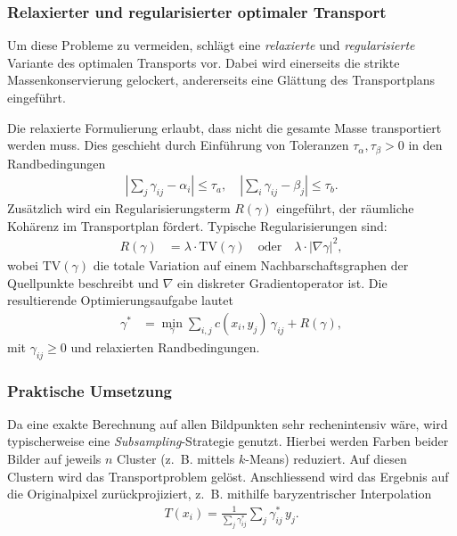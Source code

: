 \subsubsection{Relaxierter und regularisierter optimaler Transport}
Um diese Probleme zu vermeiden,
schlägt \cite{mongekant:color} eine \emph{relaxierte} und \emph{regularisierte}
%
%
Variante des optimalen Transports vor.
Dabei wird einerseits die strikte Massenkonservierung gelockert,
andererseits eine Glättung des Transportplans eingeführt.

Die relaxierte Formulierung erlaubt,
dass nicht die gesamte Masse transportiert werden muss.
Dies geschieht durch Einführung von Toleranzen $\tau_\alpha, \tau_\beta > 0$
in den Randbedingungen
\begin{align*}
\left| \sum_{j} \gamma_{ij} - \alpha_i \right|
\leq
\tau_a
, \quad
\left| \sum_{i} \gamma_{ij} - \beta_j \right|
\leq
\tau_b.
\end{align*}
Zusätzlich wird ein Regularisierungsterm $R(\gamma)$ eingeführt,
der räumliche Kohärenz im Transportplan fördert.
Typische Regularisierungen sind:
\begin{align*}
R(\gamma)
&=
\lambda \cdot \mathrm{TV}(\gamma)
\quad \text{oder} \quad
\lambda \cdot |\nabla \gamma|^2,
\end{align*}
wobei $\mathrm{TV}(\gamma)$ die totale Variation \cite{mongekant:totvar}
auf einem Nachbarschaftsgraphen der Quellpunkte beschreibt
und $\nabla$ ein diskreter Gradientoperator ist.
Die resultierende Optimierungsaufgabe lautet
\begin{align*}
\gamma^\ast
&=
\min_{\gamma} \sum_{i,j} c(x_i, y_j)\, \gamma_{ij} + R(\gamma),
\end{align*}
mit $\gamma_{ij} \geq 0$ und relaxierten Randbedingungen.

\subsubsection{Praktische Umsetzung}
Da eine exakte Berechnung auf allen Bildpunkten sehr rechenintensiv wäre,
wird typischerweise eine \emph{Subsampling}-Strategie genutzt.
Hierbei werden Farben beider Bilder auf jeweils $n$ Cluster
(z.~B. mittels $k$-Means) reduziert.
Auf diesen Clustern wird das Transportproblem gelöst.
Anschliessend wird das Ergebnis auf die Originalpixel zurückprojiziert,
z.~B. mithilfe baryzentrischer Interpolation
\begin{align*}
T(x_i)
=
\frac{1}{\sum_j \gamma^\ast_{ij}} \sum_j \gamma^\ast_{ij} \, y_j.
\end{align*}

